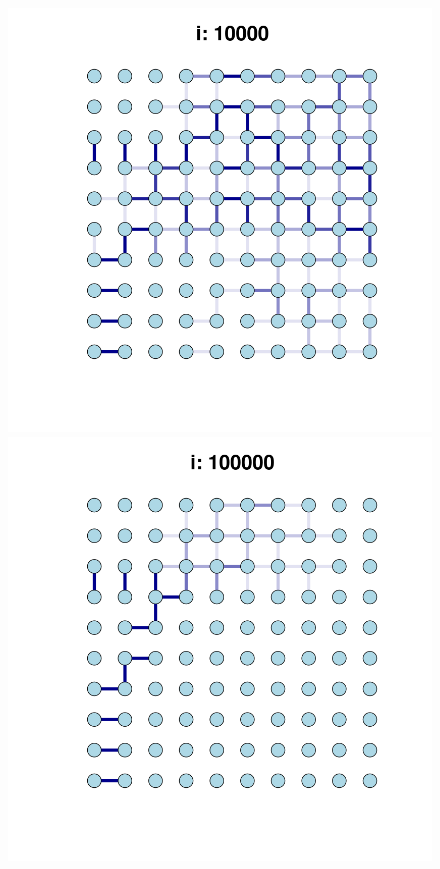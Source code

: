 \begin{figure}[h]
\begin{minipage}{0.25\textwidth}
    \end{minipage}\hfill
    \begin{minipage}{0.25\textwidth}
        \centering
        \includegraphics[width=\textwidth]{images/task30/dyn3.png}
    \end{minipage}\hfill
    \begin{minipage}{0.25\textwidth}
        \centering
        \includegraphics[width=\textwidth]{images/task30/dyn4.png}

\end{minipage}
\end{figure}

